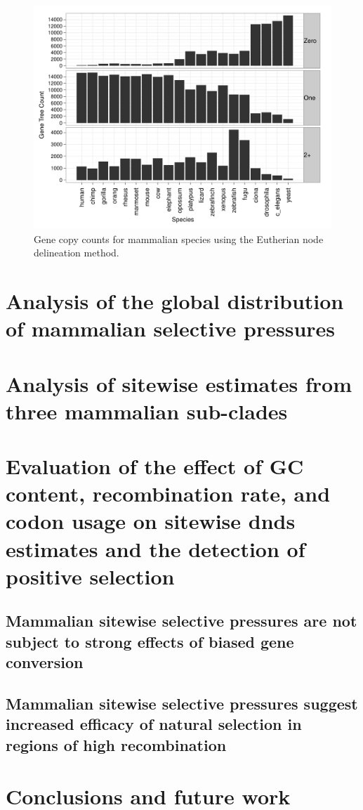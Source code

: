 \begin{figure}[h]
\begin{center}
\includegraphics[scale=0.6]{Figs/Mammals1_Fig3.pdf}
\end{center}
\caption{Gene copy counts for mammalian species using the Eutherian node delineation method.}
\label{mammals1_fig1}
\end{figure}

\section{Analysis of the global distribution of mammalian selective pressures}



\section{Analysis of sitewise estimates from three mammalian sub-clades}



\section{Evaluation of the effect of GC content, recombination rate, and codon usage on sitewise dnds estimates and the detection of positive selection}



\subsection{Mammalian sitewise selective pressures are not subject to strong effects of biased gene conversion}



\subsection{Mammalian sitewise selective pressures suggest increased efficacy of natural selection in regions of high recombination}



\section{Conclusions and future work}

